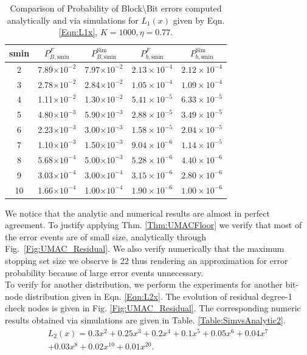 \begin{table}
\centering
\begin{tabular}{c c c c c}
\hline  \hline
smin & $P_{B,\text{smin}}^F$ & $P_{B,\text{smin}}^{\text{Sim}}$ & $P_{b,\text{smin}}^F$ & $P_{b,\text{smin}}^{\text{Sim}}$ \\
\hline
2 & 7.89$\times 10^{-2}$  &  7.97$\times 10^{-2}$ &$2.13\times 10^{-4}$&$2.12\times 10^{-4}$\\
3 & 2.78$\times 10^{-2}$  & 2.84$\times 10^{-2}$&$1.05\times 10^{-4}$&$1.09\times 10^{-4}$ \\
4 & 1.11$\times 10^{-2}$  &1.30$\times 10^{-2}$ &$5.41\times 10^{-5}$&$6.33\times 10^{-5}$\\
5 & 4.80$\times 10^{-3}$  &5.90$\times 10^{-3}$& $2.88\times 10^{-5}$&$3.49\times 10^{-5}$\\
6 & 2.23$\times 10^{-3}$  &3.00$\times 10^{-3}$ &$1.58\times 10^{-5}$&$2.04\times 10^{-5}$\\
7 & 1.10$\times 10^{-3}$  &1.50$\times 10^{-3}$ &$9.04\times 10^{-6}$&$1.14\times 10^{-5}$\\
8 &5.68$\times 10^{-4}$   &5.00$\times 10^{-3}$&$5.28\times 10^{-6}$&$4.40\times 10^{-6}$\\
9 & 3.03$\times 10^{-4}$  &3.00$\times 10^{-4}$ & $3.15\times 10^{-6}$&$2.80\times 10^{-6}$\\
10 & 1.66$\times 10^{-4}$ &1.00$\times 10^{-4}$&$1.90\times 10^{-6}$&$1.00\times 10^{-6}$\\
\end{tabular}
\caption{Comparison of Probability of Block\textbackslash Bit errors computed analytically and via simulations for $L_1(x)$ given by Eqn. \eqref{Eqn:L1x}, $K=1000, \eta=0.77$.}
\label{Table:SimvsAnalytic1}
\end{table}

We notice that the analytic and numerical results are almost in perfect agreement. To justify applying Thm. \ref{Thm:UMACFloor} we verify that most of the error events are of small size, analytically through Fig.~\ref{Fig:UMAC_Residual}. We also verify numerically that the maximum stopping set size we observe is 22 thus rendering an approximation for error probability because of large error events unnecessary. \\

To verify for another distribution, we perform the experiments for another bit-node distribution given in Eqn. \eqref{Eqn:L2x}. The evolution of residual degree-1 check nodes is given in Fig. \ref{Fig:UMAC_Residual}. The corresponding numeric results obtained via simulations are given in Table. \ref{Table:SimvsAnalytic2}.
\begin{multline}
L_{2}(x)=0.3x^2+ 0.25 x^3+ 0.2 x^4 + 0.1 x^5+ 0.05 x^{6} + 0.04 x^{7}\\
 + 0.03 x^{8} + 0.02 x^{10}+ 0.01 x^{20}.
\label{Eqn:L2x}
\end{multline}

